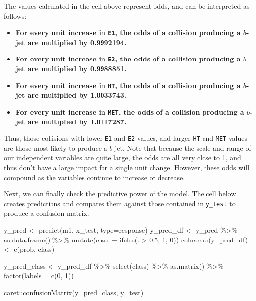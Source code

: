\documentclass[
]{article}
\newenvironment{Shaded}{\begin{snugshade}}{\end{snugshade}}
\newcommand{\AttributeTok}[1]{\textcolor[rgb]{0.77,0.63,0.00}{#1}}
\newcommand{\DecValTok}[1]{\textcolor[rgb]{0.00,0.00,0.81}{#1}}
\newcommand{\FloatTok}[1]{\textcolor[rgb]{0.00,0.00,0.81}{#1}}
\newcommand{\FunctionTok}[1]{\textcolor[rgb]{0.00,0.00,0.00}{#1}}
\newcommand{\NormalTok}[1]{#1}
\newcommand{\OtherTok}[1]{\textcolor[rgb]{0.56,0.35,0.01}{#1}}
\newcommand{\SpecialCharTok}[1]{\textcolor[rgb]{0.00,0.00,0.00}{#1}}
\newcommand{\StringTok}[1]{\textcolor[rgb]{0.31,0.60,0.02}{#1}}
\providecommand{\tightlist}{%
  \setlength{\itemsep}{0pt}\setlength{\parskip}{0pt}}
\begin{document}
The values calculated in the cell above represent odds, and can be
interpreted as follows:

\begin{itemize}
\tightlist
\item
  \textbf{For every unit increase in \texttt{E1}, the odds of a
  collision producing a \(b\)-jet are multiplied by 0.9992194.}
\item
  \textbf{For every unit increase in \texttt{E2}, the odds of a
  collision producing a \(b\)-jet are multiplied by 0.9988851.}
\item
  \textbf{For every unit increase in \texttt{HT}, the odds of a
  collision producing a \(b\)-jet are multiplied by 1.0033743.}
\item
  \textbf{For every unit increase in \texttt{MET}, the odds of a
  collision producing a \(b\)-jet are multiplied by 1.0117287.}
\end{itemize}

Thus, those collisions with lower \texttt{E1} and \texttt{E2} values,
and larger \texttt{HT} and \texttt{MET} values are those most likely to
produce a \(b\)-jet. Note that because the scale and range of our
independent variables are quite large, the odds are all very close to 1,
and thus don't have a large impact for a single unit change. However,
these odds will compound as the variables continue to increase or
decrease.

Next, we can finally check the predictive power of the model. The cell
below creates predictions and compares them against those contained in
\texttt{y\_test} to produce a confusion matrix.

\begin{Shaded}
\begin{Highlighting}[]
\NormalTok{y\_pred }\OtherTok{\textless{}{-}} \FunctionTok{predict}\NormalTok{(m1, x\_test, }\AttributeTok{type=}\StringTok{\textquotesingle{}response\textquotesingle{}}\NormalTok{) }
\NormalTok{y\_pred\_df }\OtherTok{\textless{}{-}}\NormalTok{ y\_pred }\SpecialCharTok{\%\textgreater{}\%}
    \FunctionTok{as.data.frame}\NormalTok{() }\SpecialCharTok{\%\textgreater{}\%}
      \FunctionTok{mutate}\NormalTok{(}\AttributeTok{class =} \FunctionTok{ifelse}\NormalTok{(. }\SpecialCharTok{\textgreater{}} \FloatTok{0.5}\NormalTok{, }\DecValTok{1}\NormalTok{, }\DecValTok{0}\NormalTok{))}
\FunctionTok{colnames}\NormalTok{(y\_pred\_df) }\OtherTok{\textless{}{-}} \FunctionTok{c}\NormalTok{(}\StringTok{\textquotesingle{}prob\textquotesingle{}}\NormalTok{, }\StringTok{\textquotesingle{}class\textquotesingle{}}\NormalTok{)}

\NormalTok{y\_pred\_class }\OtherTok{\textless{}{-}}\NormalTok{ y\_pred\_df }\SpecialCharTok{\%\textgreater{}\%}
  \FunctionTok{select}\NormalTok{(class) }\SpecialCharTok{\%\textgreater{}\%} \FunctionTok{as.matrix}\NormalTok{() }\SpecialCharTok{\%\textgreater{}\%}
    \FunctionTok{factor}\NormalTok{(}\AttributeTok{labels =} \FunctionTok{c}\NormalTok{(}\DecValTok{0}\NormalTok{, }\DecValTok{1}\NormalTok{))}

\NormalTok{caret}\SpecialCharTok{::}\FunctionTok{confusionMatrix}\NormalTok{(y\_pred\_class, y\_test)}
\end{Highlighting}
\end{Shaded}
\end{document}
